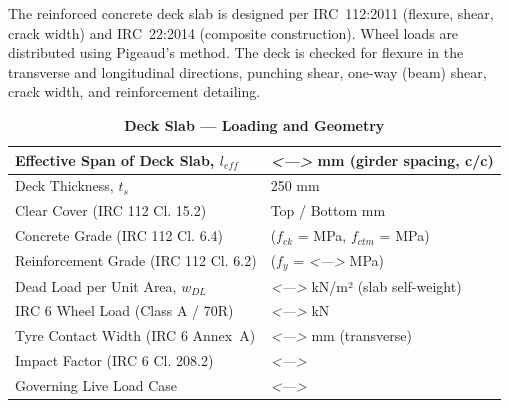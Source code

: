 \documentclass[12pt,a4paper]{report}
\numberwithin{table}{chapter}
\numberwithin{figure}{chapter}
\newcommand{\placeholder}[1]{\textit{\textless #1\textgreater}}
\begin{document}
The reinforced concrete deck slab is designed per IRC~112:2011 (flexure, shear, crack width) and IRC~22:2014 (composite construction). Wheel loads are distributed using Pigeaud's method. The deck is checked for flexure in the transverse and longitudinal directions, punching shear, one-way (beam) shear, crack width, and reinforcement detailing.

\vspace{1em}
\begin{longtable}{|L{5.5cm}|p{10.0cm}|}
\caption{\textbf{Deck Slab --- Loading and Geometry}}
\hline
\textnormal{Effective Span of Deck Slab, $l_{eff}$} & \placeholder{---} mm (girder spacing, c/c) \\[6pt]
\hline
\textnormal{Deck Thickness, $t_s$} & 250 mm \\[6pt]
\hline
\textnormal{Clear Cover (IRC 112 Cl. 15.2)} & Top  / Bottom  mm \\[6pt]
\hline
\textnormal{Concrete Grade (IRC 112 Cl. 6.4)} &  ($f_{ck}$ =  MPa, $f_{ctm}$ =  MPa) \\[6pt]
\hline
\textnormal{Reinforcement Grade (IRC 112 Cl. 6.2)} &  ($f_y$ = \placeholder{---} MPa) \\[6pt]
\hline
\textnormal{Dead Load per Unit Area, $w_{DL}$} & \placeholder{---} kN/m² (slab self-weight) \\[6pt]
\hline
\textnormal{IRC 6 Wheel Load (Class A / 70R)} & \placeholder{---} kN \\[6pt]
\hline
\textnormal{Tyre Contact Width (IRC 6 Annex~A)} & \placeholder{---} mm (transverse) \\[6pt]
\hline
\textnormal{Impact Factor (IRC 6 Cl. 208.2)} & \placeholder{---} \\[6pt]
\hline
\textnormal{Governing Live Load Case} & \placeholder{---} \\[6pt]
\hline
\end{longtable}
\end{document}
